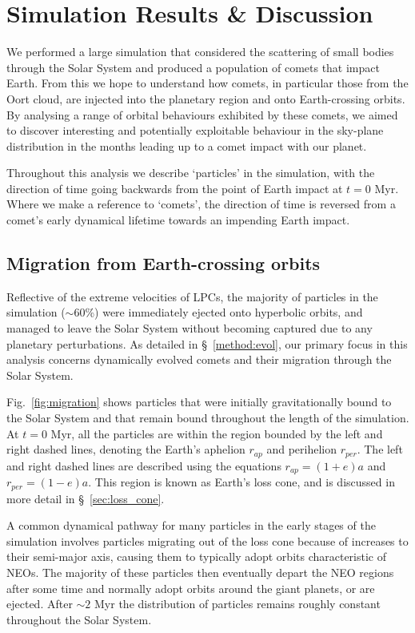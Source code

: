 \chapter{Simulation Results \& Discussion}
\label{chap:results}

We performed a large simulation that considered the scattering of small bodies through the Solar System and produced a population of comets that impact Earth. From this we hope to understand how comets, in particular those from the Oort cloud, are injected into the planetary region and onto Earth-crossing orbits. By analysing a range of orbital behaviours exhibited by these comets, we aimed to discover interesting and potentially exploitable behaviour in the sky-plane distribution in the months leading up to a comet impact with our planet.

Throughout this analysis we describe `particles' in the simulation, with the direction of time going backwards from the point of Earth impact at $t=0$ Myr. Where we make a reference to `comets', the direction of time is reversed from a comet's early dynamical lifetime towards an impending Earth impact.

\section{Migration from Earth-crossing orbits}
\label{sec:migration}

Reflective of the extreme velocities of LPCs, the majority of particles in the simulation ($\sim60$\%) were immediately ejected onto hyperbolic orbits, and managed to leave the Solar System without becoming captured due to any planetary perturbations. As detailed in \S~\ref{method:evol}, our primary focus in this analysis concerns dynamically evolved comets and their migration through the Solar System.

Fig.~\ref{fig:migration} shows particles that were initially gravitationally bound to the Solar System and that remain bound throughout the length of the simulation. At $t=0$ Myr, all the particles are within the region bounded by the left and right dashed lines, denoting the Earth's aphelion $r_{ap}$ and perihelion $r_{per}$. The left and right dashed lines are described using the equations $r_{ap} = (1+e)a$ and $r_{per} = (1-e)a$. This region is known as Earth's loss cone, and is discussed in more detail in \S~\ref{sec:loss_cone}. 

A common dynamical pathway for many particles in the early stages of the simulation involves particles migrating out of the loss cone because of increases to their semi-major axis, causing them to typically adopt orbits characteristic of NEOs. The majority of these particles then eventually depart the NEO regions after some time and normally adopt orbits around the giant planets, or are ejected. After $\sim2$ Myr the distribution of particles remains roughly constant throughout the Solar System.

